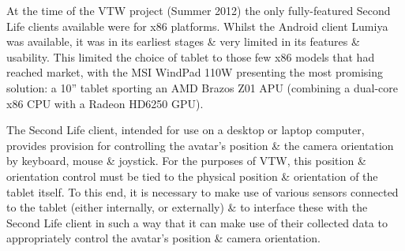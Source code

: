 
At the time of the VTW project (Summer 2012) the only fully-featured Second Life clients available were for x86 platforms. Whilst the Android client Lumiya\LumiyaFootnote{} was available, it was in its earliest stages \& very limited in its features \& usability. This limited the choice of tablet to those few x86 models that had reached market, with the MSI WindPad 110W\WindpadFootnote{} presenting the most promising solution: a 10'' tablet sporting an AMD Brazos Z01 APU (combining a dual-core x86 CPU with a Radeon HD6250 GPU).

The Second Life client, intended for use on a desktop or laptop computer, provides provision for controlling the avatar's position \& the camera orientation by keyboard, mouse \& joystick. For the purposes of VTW, this position \& orientation control must be tied to the physical position \& orientation of the tablet itself. To this end, it is necessary to make use of various sensors connected to the tablet (either internally, or externally) \& to interface these with the Second Life client in such a way that it can make use of their collected data to appropriately control the avatar's position \& camera orientation.





